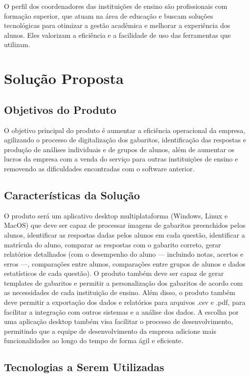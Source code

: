 \documentclass[12pt]{article}
\begin{document}
O perfil dos coordenadores das instituições de ensino são profissionais com formação superior, que atuam na área de educação e buscam soluções tecnológicas para otimizar a gestão acadêmica e melhorar a experiência dos alunos. Eles valorizam a eficiência e a facilidade de uso das ferramentas que utilizam.

\section{Solução Proposta}

\subsection{Objetivos do Produto}

O objetivo principal do produto é aumentar a eficiência operacional da empresa, agilizando o processo de digitalização dos gabaritos, identificação das respostas e produção de análises individuais e de grupos de alunos, além de aumentar os lucros da empresa com a venda do serviço para outras instituições de ensino e removendo as dificuldades encontradas com o software anterior.


\subsection{Características da Solução}
O produto será um aplicativo desktop multiplataforma (Windows, Linux e MacOS) que deve ser capaz de processar imagens de gabaritos preenchidos pelos alunos, identificar as respostas dadas pelos alunos em cada questão, identificar a matrícula do aluno, comparar as respostas com o gabarito correto, gerar relatórios detalhados (com o desempenho do aluno — incluindo notas, acertos e erros —, comparações entre alunos, comparações entre grupos de alunos e dados estatísticos de cada questão). O produto também deve ser capaz de gerar templates de gabaritos e permitir a personalização dos gabaritos de acordo com as necessidades de cada instituição de ensino. Além disso, o produto também deve permitir a exportação dos dados e relatórios para arquivos .csv e .pdf, para facilitar a integração com outros sistemas e a análise dos dados. A escolha por uma aplicação desktop também visa facilitar o processo de desenvolvimento, permitindo que a equipe de desenvolvimento da empresa adicione mais funcionalidades ao longo do tempo de forma ágil e eficiente.


\subsection{Tecnologias a Serem Utilizadas}
\end{document}
